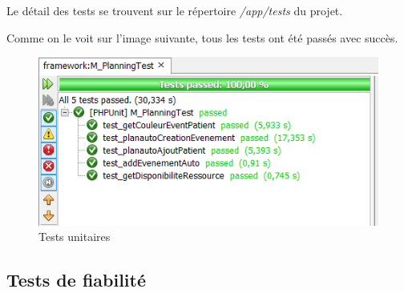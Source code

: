 \documentclass{polytech/polytech}
\begin{document}
Le détail des tests se trouvent sur le répertoire \textit{/app/tests} du projet.

Comme on le voit sur l'image suivante, tous les tests ont été passés avec succès.

\begin{figure}
	\includegraphics[scale=0.85]{images/testsPassed}
	\caption{Tests unitaires}
	\label{fig:testsunit}
\end{figure}

\subsection{Tests de fiabilité}
\end{document}
